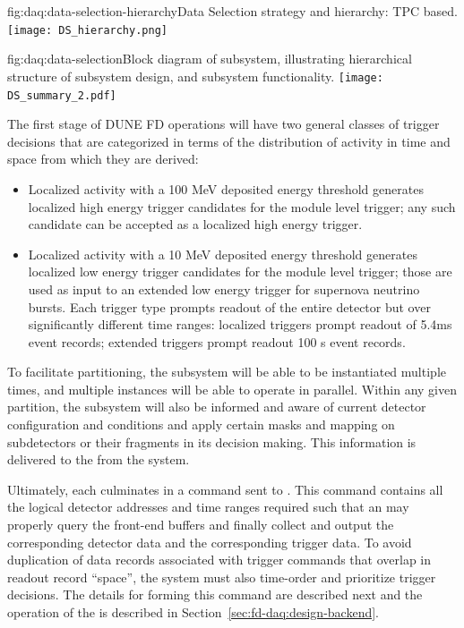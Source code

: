 
\begin{dunefigure}{fig:daq:data-selection-hierarchy}{Data Selection
    strategy and hierarchy: TPC based.}
  \texttt{[image: DS\_hierarchy.png]}
\end{dunefigure}

\begin{dunefigure}{fig:daq:data-selection}{Block diagram of  
     subsystem, illustrating hierarchical structure of
    subsystem design, and subsystem functionality.}
  \texttt{[image: DS\_summary\_2.pdf]}
\end{dunefigure}


The first stage of DUNE FD operations will have two general classes of trigger
decisions that are categorized in terms of the distribution of activity
in time and space from which they are derived: 
\begin{itemize}
\item Localized activity
    with a 100 MeV deposited energy
    threshold generates localized high energy trigger candidates for
    the module level trigger; any such candidate can be accepted as a localized high energy trigger.
\item    Localized activity with a 10 MeV deposited energy threshold
    generates localized low energy trigger candidates for the module
    level trigger; those are used as input to an extended low energy trigger
    for supernova neutrino bursts. Each trigger type prompts readout
    of the entire detector but over significantly different time
    ranges: localized triggers prompt readout of 5.4\si{\milli\second} event records; extended
    triggers prompt readout 100 s event records. 
\end{itemize}

To facilitate partitioning, the  subsystem will be
able to be instantiated multiple times, and multiple instances will be
able to operate in parallel. Within any
given partition, the  subsystem will also be
informed and aware of current detector configuration and conditions and
apply certain masks and mapping on subdetectors or their fragments in
its decision making. This information is delivered to the
 from the  system.

Ultimately, each  culminates in a command sent to . 
This command contains all the logical detector addresses and time ranges
required such that an  may properly query the front-end
buffers and finally collect and output the corresponding detector data
and the corresponding trigger data. To avoid duplication of data
records associated with trigger commands that overlap in readout
record ``space'', the  system must also time-order and
prioritize trigger decisions. The details for forming this
command are described next and the operation of the  is
described in Section~\ref{sec:fd-daq:design-backend}.

